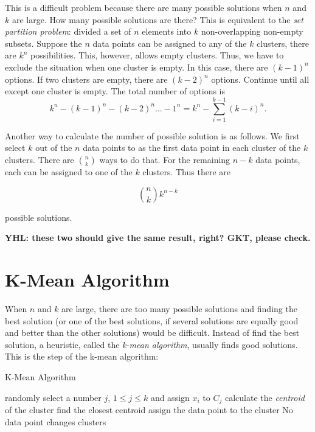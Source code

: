 This is a difficult problem because there are many possible solutions
when $n$ and $k$ are large. How many possible solutions are there?
This is equivalent to the {\it set partition problem}: divided a set
of $n$ elements into $k$ non-overlapping non-empty subsets.  Suppose
the $n$ data points can be assigned to any of the $k$ clusters, there
are $k^n$ possibilities.  This, however, allows empty clusters.  Thus,
we have to exclude the situation when one cluster is empty. In this
case, there are $(k-1)^n$ options.  If two clusters are empty, there
are $(k-2)^n$ options.  Continue until all except one cluster is
empty. The total number of options is 
\begin{equation}
k^n - (k-1)^n - (k -2) ^ n ... - 1^n = k^n - \underset{i = 1}{\overset{k-1} \sum} (k-i)^n.
\end{equation}  

Another way to calculate the number of possible solution is as follows.
We first select $k$ out of the $n$ data points to as the first data
point in each cluster of the $k$ clusters. There are $\binom{n}{k}$
ways to do that.  For the remaining $n-k$ data points, each can be
assigned to one of the $k$ clusters. Thus there are

\begin{equation}
  \binom{n}{k} k^{n-k}
\end{equation}

possible solutions.

{\bf YHL: these two should give the same result, right? GKT, please check.}



\section{K-Mean Algorithm}


When $n$ and $k$ are large, there are too many possible solutions and
finding the best solution (or one of the best solutions, if several
solutions are equally good and better than the other solutions) would
be difficult. Instead of find the best solution, a heuristic, called
the {\it k-mean algorithm}, usually finds good solutions.  This is the
step of the k-mean algorithm:


\begin{algorithm}
    \caption[]{K-Mean Algorithm}
    \begin{algorithmic}[1]
      randomly select a number $j$, $1 \le j \le k$ and assign
      $x_i$ to $C_j$
      \EndFor
      \Repeat 
      \State
      calculate the {\it centroid} of the cluster
      \EndFor
      \State find the closest centroid
      \State assign the data point to  the cluster
      \EndFor
      \Until No data point changes clusters
    \end{algorithmic}
    \label{algorithm:kmean}
\end{algorithm}


